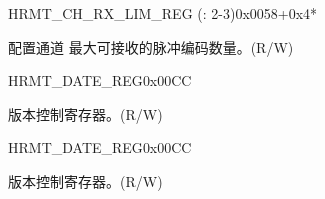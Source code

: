 \begin{register}{H}{RMT\_CH\_RX\_LIM\_REG (: 2-3)}{0x0058+0x4*}\label{regdesc:RMTCHMRXLIMREG}
%
%
\regnewline%
\begin{regdesc}\begin{reglist}
\label{fielddesc:RMTRXLIMCHM}\item [RMT\_RX\_LIM\_CH\regindex{m}] 配置通道  最大可接收的脉冲编码数量。(R/W)
\end{reglist}\end{regdesc}
\end{register}


{%
\begin{register}{H}{RMT\_DATE\_REG}{0x00CC}\label{regdesc:RMTDATEREG}
%
%
\regnewline%
\begin{regdesc}\begin{reglist}
\label{fielddesc:RMTDATE}\item [RMT\_DATE] 版本控制寄存器。(R/W)
\end{reglist}\end{regdesc}
\end{register}
}
{%
\begin{register}{H}{RMT\_DATE\_REG}{0x00CC}\label{regdesc:RMTDATEREG}
%
%
\regnewline%
\begin{regdesc}\begin{reglist}
\label{fielddesc:RMTDATE}\item [RMT\_DATE] 版本控制寄存器。(R/W)
\end{reglist}\end{regdesc}
\end{register}
}
